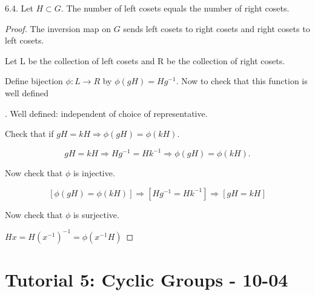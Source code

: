 \documentclass[11pt]{scrartcl}
\begin{document}
\begin{theorem}
  6.4. Let $H \subset G$. The number of left cosets equals the number of right cosets.
  \begin{proof}
    The inversion map on $G$ sends left cosets to right cosets and right cosets to left cosets.

    Let L be the collection of left cosets and R be the collection of right cosets.

    Define bijection $\phi:L\to R$ by $\phi(gH) = Hg^{-1}$. Now to check that this function is well defined
    \begin{definition}.
      Well defined: independent of choice of representative.
    \end{definition}
    Check that if $gH = kH \Rightarrow \phi(gH) = \phi(kH)$.

    $$gH = kH \Rightarrow Hg^{-1} = Hk^{-1} \Rightarrow \phi(gH) = \phi(kH).$$

    Now check that $\phi$ is injective.

    $$ [\phi(gH) = \phi(kH)] \Rightarrow [Hg^{-1} = Hk^{-1}] \Rightarrow [gH = kH] $$

    Now check that $\phi$ is surjective.

    $Hx = H(x^{-1})^{-1} = \phi(x^{-1}H)$
  \end{proof}
\end{theorem}

\section{Tutorial 5: Cyclic Groups - 10-04}
\end{document}

